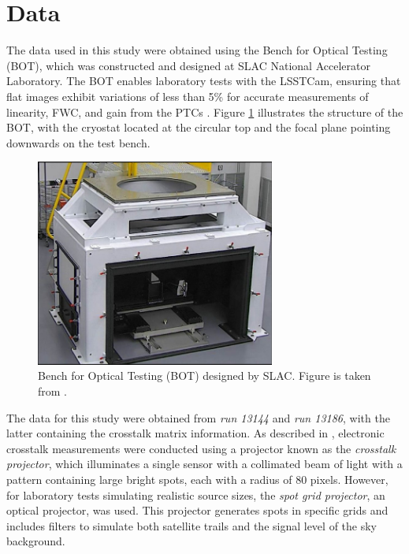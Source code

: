 \section{Data} \label{sec:data}
The data used in this study were obtained using the Bench for Optical Testing (BOT), which was constructed and designed at SLAC National Accelerator Laboratory. The BOT enables laboratory tests with the LSSTCam, ensuring that flat images exhibit variations of less than 5\% for accurate measurements of linearity, FWC, and gain from the PTCs \citep{newbry2018lsst}. Figure \ref{fig:BOT_stand} illustrates the structure of the BOT, with the cryostat located at the circular top and the focal plane pointing downwards on the test bench.

\begin{figure}[!htb]
    \centering
    \includegraphics[width=0.7\textwidth]{Figures/BOT_stand.png}
    \caption{Bench for Optical Testing (BOT) designed by SLAC. Figure is taken from \cite{newbry2018lsst}. }
    \label{fig:BOT_stand}
\end{figure}

The data for this study were obtained from \textit{run 13144} and \textit{run 13186}, with the latter containing the crosstalk matrix information. As described in \cite{snyder2020laboratory}, electronic crosstalk measurements were conducted using a projector known as the \textit{crosstalk projector}, which illuminates a single sensor with a collimated beam of light with a pattern containing large bright spots, each with a radius of 80 pixels. However, for laboratory tests simulating realistic source sizes, the \textit{spot grid projector}, an optical projector, was used. This projector generates spots in specific grids and includes filters to simulate both satellite trails and the signal level of the sky background.